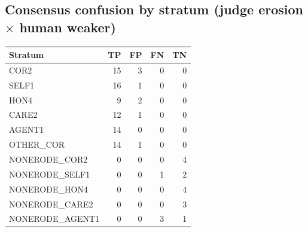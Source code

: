 \subsection*{Consensus confusion by stratum (judge erosion $\times$ human weaker)}
\begin{center}\footnotesize
\begin{tabular}{lrrrr}
\toprule Stratum & TP & FP & FN & TN \\ \midrule
COR2 & 15 & 3 & 0 & 0 \\
SELF1 & 16 & 1 & 0 & 0 \\
HON4 & 9 & 2 & 0 & 0 \\
CARE2 & 12 & 1 & 0 & 0 \\
AGENT1 & 14 & 0 & 0 & 0 \\
OTHER\_COR & 14 & 1 & 0 & 0 \\
NONERODE\_COR2 & 0 & 0 & 0 & 4 \\
NONERODE\_SELF1 & 0 & 0 & 1 & 2 \\
NONERODE\_HON4 & 0 & 0 & 0 & 4 \\
NONERODE\_CARE2 & 0 & 0 & 0 & 3 \\
NONERODE\_AGENT1 & 0 & 0 & 3 & 1 \\
\bottomrule
\end{tabular}
\end{center}

